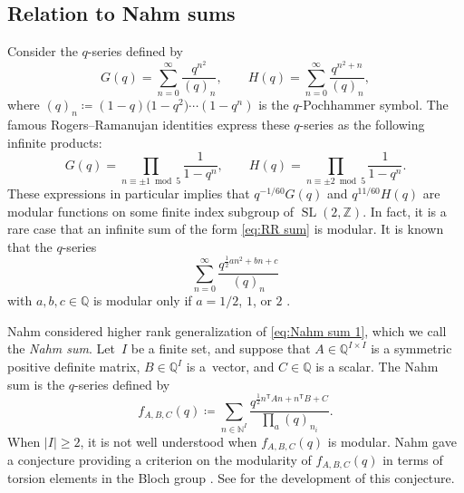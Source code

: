 \documentclass[10pt,a4paper]{amsart}
\numberwithin{equation}{section}
\theoremstyle{definition}
\DeclareMathOperator{\SL}{SL}
\begin{document}
\subsection{Relation to Nahm sums}\label{section:nahm sum}
Consider the $q$-series defined by
\begin{equation}\label{eq:RR sum}
 G(q) = \sum_{n=0}^\infty \frac{q^{n^2}}{(q)_n} ,\qquad
 H(q) = \sum_{n=0}^\infty \frac{q^{n^2+n}}{(q)_n},
\end{equation}
where $(q)_n \coloneqq (1-q) \bigl(1-q^2\bigr) \cdots (1-q^n)$ is the $q$-Pochhammer symbol.
The famous Rogers--Ramanujan identities express these $q$-series as the following infinite products:
\begin{equation*}
 G(q) = \prod_{n \equiv \pm 1 \bmod 5} \frac{1}{1 - q^n},\qquad
 H(q) = \prod_{n \equiv \pm 2 \bmod 5} \frac{1}{1 - q^n} .
\end{equation*}
These expressions in particular implies that $q^{-1/60} G(q)$ and $q^{11/60} H(q)$ are
modular functions on some finite index subgroup of $\SL (2, \mathbb{Z})$.
In fact, it is a rare case that an infinite sum of the form \eqref{eq:RR sum} is modular. It is known that the $q$-series
\begin{equation}\label{eq:Nahm sum 1}
 \sum_{n = 0}^\infty \frac{q^{ \frac{1}{2} a n^2 + b n + c}}{(q)_{n}}
\end{equation}
with $a,b,c \in \mathbb{Q}$ is modular only if $a = 1/2$, $1$, or $2$ \cite{Zagier}.

Nahm \cite{Nahm} considered higher rank generalization of \eqref{eq:Nahm sum 1},
which we call the \emph{Nahm sum}.
Let~$I$ be a finite set, and suppose that $A \in \mathbb{Q}^{I \times I}$ is a symmetric positive definite matrix,
$B \in \mathbb{Q}^I$ is a~vector,
and $C \in \mathbb{Q}$ is a scalar.
The Nahm sum is the $q$-series defined by
\begin{equation*}
 f_{A, B, C} (q) \coloneqq \sum_{n \in \mathbb{N}^I}
 \frac{q^{ \frac{1}{2} n^\mathsf{T} A n + n^\mathsf{T} B +C}}{ \prod_a (q)_{n_i}}.
\end{equation*}
When $\lvert I \rvert \geq 2$, it is not well understood when $f_{A,B,C}(q)$ is modular.
Nahm gave a conjecture providing a criterion on the modularity of $f_{A, B, C} (q)$
in terms of torsion elements in the Bloch group \cite{Nahm, Zagier}.
See \cite{calegari2017bloch, VlasenkoZwegers} for the development of this conjecture.
\end{document}
